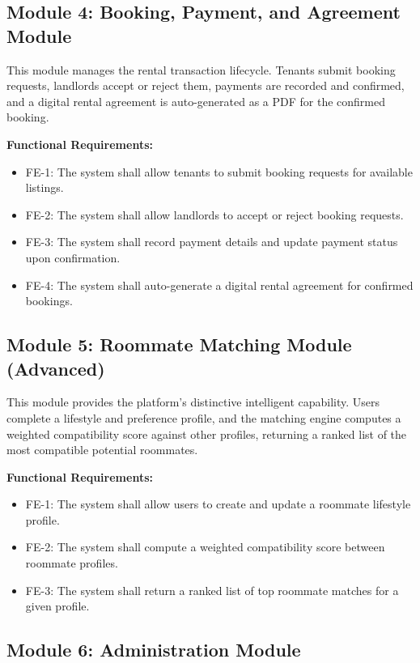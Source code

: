 \subsection{Module 4: Booking, Payment, and Agreement Module}

This module manages the rental transaction lifecycle. Tenants submit booking requests, landlords accept or reject them, payments are recorded and confirmed, and a digital rental agreement is auto-generated as a PDF for the confirmed booking.

\textbf{Functional Requirements:}

\begin{itemize}
    \item FE-1: The system shall allow tenants to submit booking requests for available listings.
    \item FE-2: The system shall allow landlords to accept or reject booking requests.
    \item FE-3: The system shall record payment details and update payment status upon confirmation.
    \item FE-4: The system shall auto-generate a digital rental agreement for confirmed bookings.
\end{itemize}

\subsection{Module 5: Roommate Matching Module (Advanced)}

This module provides the platform's distinctive intelligent capability. Users complete a lifestyle and preference profile, and the matching engine computes a weighted compatibility score against other profiles, returning a ranked list of the most compatible potential roommates.

\textbf{Functional Requirements:}

\begin{itemize}
    \item FE-1: The system shall allow users to create and update a roommate lifestyle profile.
    \item FE-2: The system shall compute a weighted compatibility score between roommate profiles.
    \item FE-3: The system shall return a ranked list of top roommate matches for a given profile.
\end{itemize}

\subsection{Module 6: Administration Module}

